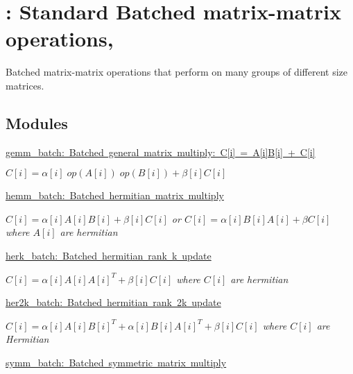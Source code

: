 \hypertarget{group__group__blas3}{}\section{\+: Standard Batched matrix-\/matrix operations,}
\label{group__group__blas3}


Batched matrix-\/matrix operations that perform on many groups of different size matrices.  


\subsection*{Modules}
\begin{DoxyCompactItemize}
\item 
\mbox{\hyperlink{group__gemm__batch}{gemm\+\_\+batch\+:  Batched general matrix multiply\+: C\mbox{[}i\mbox{]} = A\mbox{[}i\mbox{]}\+B\mbox{[}i\mbox{]} + C\mbox{[}i\mbox{]}}}
\begin{DoxyCompactList}\small\item\em $ C[i] = \alpha[i] \;op(A[i]) \;op(B[i]) + \beta[i] C[i] $ \end{DoxyCompactList}\item 
\mbox{\hyperlink{group__hemm__batch}{hemm\+\_\+batch\+: Batched hermitian matrix multiply}}
\begin{DoxyCompactList}\small\item\em $ C[i] = \alpha[i] A[i] B[i] + \beta[i] C[i] $ or $ C[i] = \alpha[i] B[i] A[i] + \beta C[i] $ where $ A[i] $ are hermitian \end{DoxyCompactList}\item 
\mbox{\hyperlink{group__herk__batch}{herk\+\_\+batch\+:  Batched hermitian rank k update}}
\begin{DoxyCompactList}\small\item\em $ C[i] = \alpha[i] A[i] A[i]^T + \beta[i] C[i] $ where $ C[i] $ are hermitian \end{DoxyCompactList}\item 
\mbox{\hyperlink{group__her2k__batch}{her2k\+\_\+batch\+: Batched hermitian rank 2k update}}
\begin{DoxyCompactList}\small\item\em $ C[i] = \alpha[i] A[i] B[i]^T + \alpha[i] B[i] A[i]^T + \beta[i] C[i] $ where $ C[i] $ are Hermitian \end{DoxyCompactList}\item 
\mbox{\hyperlink{group__symm__batch}{symm\+\_\+batch\+:  Batched symmetric matrix multiply}}

\end{DoxyCompactItemize}
